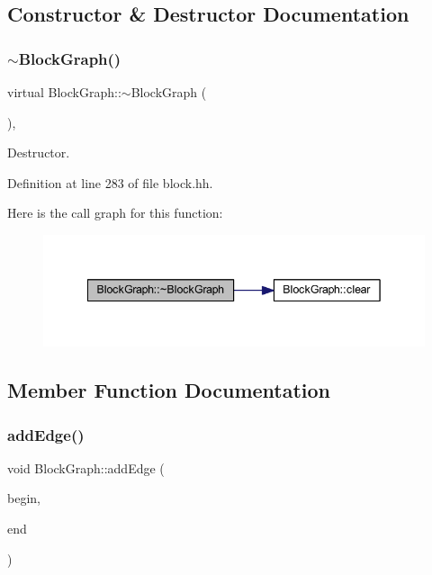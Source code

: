 \subsection{Constructor \& Destructor Documentation}
\mbox{\label{class_block_graph_abfd6feefb295ef518337a4715992f533}} 
\subsubsection{\texorpdfstring{$\sim$BlockGraph()}{~BlockGraph()}}
{\footnotesize\ttfamily virtual Block\+Graph\+::$\sim$\+Block\+Graph (\begin{DoxyParamCaption}\item[{void}]{ }\end{DoxyParamCaption})\hspace{0.3cm}{\ttfamily [inline]}, {\ttfamily [virtual]}}



Destructor. 



Definition at line 283 of file block.\+hh.

Here is the call graph for this function\+:
\nopagebreak
\begin{figure}[H]
\begin{center}
\leavevmode
\includegraphics[width=342pt]{class_block_graph_abfd6feefb295ef518337a4715992f533_cgraph}
\end{center}
\end{figure}


\subsection{Member Function Documentation}
\mbox{\label{class_block_graph_a0bd135694f8274979c03d005d796d81f}} 
\subsubsection{\texorpdfstring{addEdge()}{addEdge()}}
{\footnotesize\ttfamily void Block\+Graph\+::add\+Edge (\begin{DoxyParamCaption}\item[{\mbox{\hyperlink{class_flow_block}{Flow\+Block}} $\ast$}]{begin,  }\item[{\mbox{\hyperlink{class_flow_block}{Flow\+Block}} $\ast$}]{end }\end{DoxyParamCaption})}



